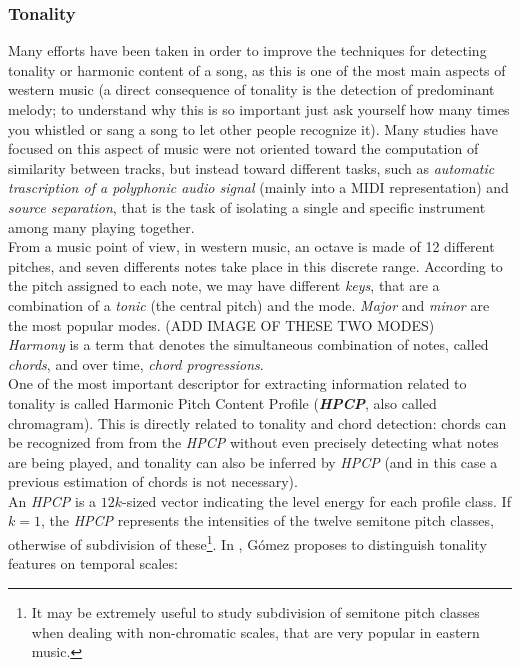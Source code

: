 \subsubsection{Tonality}
Many efforts have been taken in order to improve the techniques for detecting tonality or harmonic content of a song, as this is one of the most main aspects of western music (a direct consequence of tonality is the detection of predominant melody; to understand why this is so important just ask yourself how many times you whistled or sang a song to let other people recognize it). Many studies have focused on this aspect of music were not oriented toward the computation of similarity between tracks, but instead toward different tasks, such as \textit{automatic trascription of a polyphonic audio signal} (mainly into a MIDI representation) and \textit{source separation}, that is the task of isolating a single and specific instrument among many playing together. \\
From a music point of view, in western music, an octave is made of 12 different pitches, and seven differents notes take place in this discrete range. According to the pitch assigned to each note, we may have different \textit{keys}, that are a combination of a \textit{tonic} (the central pitch) and the mode. \textit{Major} and \textit{minor} are the most popular modes. (ADD IMAGE OF THESE TWO MODES) \\
\textit{Harmony} is a term that denotes the simultaneous combination of notes, called \textit{chords}, and over time, \textit{chord progressions}.  \\
One of the most important descriptor for extracting information related to tonality is called Harmonic Pitch Content Profile (\textbf{\textit{HPCP}}, also called chromagram). This is directly related to tonality and chord detection: chords can be recognized from from the \textit{HPCP} without even precisely detecting what notes are being played, and tonality can also be inferred by \textit{HPCP} (and in this case a previous estimation of chords is not necessary). \\
An \textit{HPCP} is a $12k$-sized vector indicating the level energy for each profile class. If $k=1$, the \textit{HPCP} represents the intensities of the twelve semitone pitch classes, otherwise of subdivision of these\footnote{It may be extremely useful to study subdivision of semitone pitch classes when dealing with non-chromatic scales, that are very popular in eastern music.}. In \cite{gomez06}, Gómez proposes to distinguish tonality features on temporal scales: 
